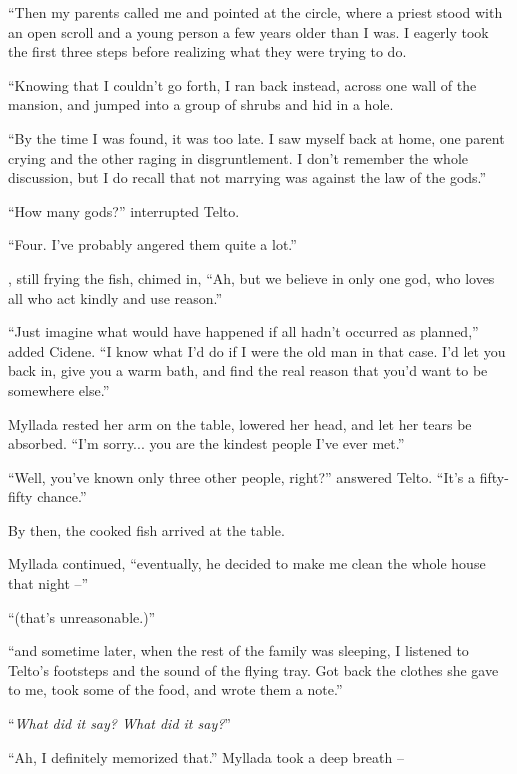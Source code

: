 ``Then my parents called me and pointed at the circle, where a priest stood with an open scroll and a young person a few years older than I was. I eagerly took the first three steps before realizing what they were trying to do.

``Knowing that I couldn't go forth, I ran back instead, across one wall of the mansion, and jumped into a group of shrubs and hid in a hole.

``By the time I was found, it was too late. I saw myself back at home, one parent crying and the other raging in disgruntlement. I don't remember the whole discussion, but I do recall that not marrying was against the law of the gods.''

``How many gods?'' interrupted Telto.

``Four. I've probably angered them quite a lot.''

\sypros, still frying the fish, chimed in, ``Ah, but we believe in only one god, who loves all who act kindly and use reason.''

``Just imagine what would have happened if all hadn't occurred as planned,'' added Cidene. ``I know what I'd do if I were the old man in that case. I'd let you back in, give you a warm bath, and find the real reason that you'd want to be somewhere else.''

Myllada rested her arm on the table, lowered her head, and let her tears be absorbed. ``I'm sorry... you are the kindest people I've ever met.''

``Well, you've known only three other people, right?'' answered Telto. ``It's a fifty-fifty chance.''

By then, the cooked fish arrived at the table.

Myllada continued, ``eventually, he decided to make me clean the whole house that night --''

``(that's unreasonable.)''

``and sometime later, when the rest of the family was sleeping, I listened to Telto's footsteps and the sound of the flying tray. Got back the clothes she gave to me, took some of the food, and wrote them a note.''

``\emph{What did it say? What did it say?}''

``Ah, I definitely memorized that.'' Myllada took a deep breath --


